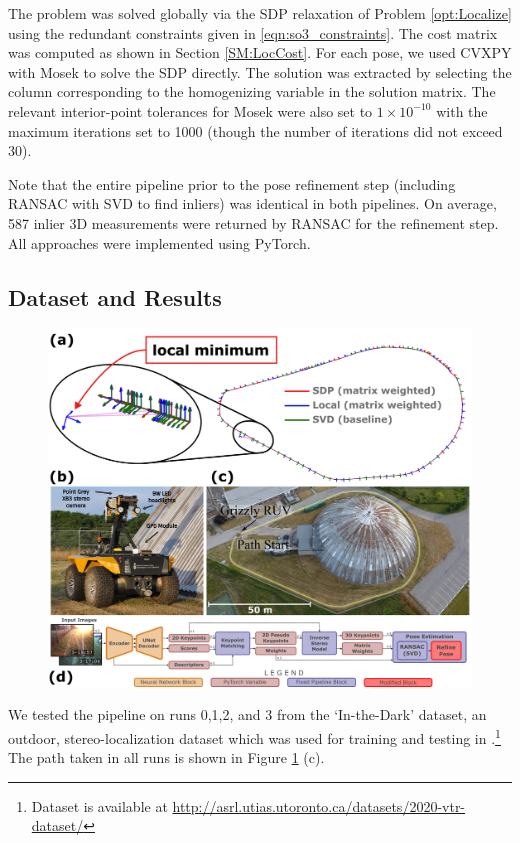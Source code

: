 \documentclass[lettersize,journal]{IEEEtran}
\begin{document}
The problem was solved globally via the SDP relaxation of Problem \eqref{opt:Localize} using the redundant constraints given in \eqref{eqn:so3_constraints}. The cost matrix was computed as shown in Section \ref{SM:LocCost}. For each pose, we used CVXPY \cite{diamondCVXPYPythonEmbeddedModeling} with Mosek \cite{mosek} to solve the SDP directly. The solution was extracted by selecting the column corresponding to the homogenizing variable in the solution matrix. The relevant interior-point tolerances for Mosek were also set to $1\times10^{-10}$ with the maximum iterations set to 1000 (though the number of iterations did not exceed 30).

Note that the entire pipeline prior to the pose refinement step (including RANSAC with SVD to find inliers) was identical in both pipelines. On average, 587 inlier 3D measurements were returned by RANSAC for the refinement step. All approaches were implemented using PyTorch.

\subsection{Dataset and Results}

\begin{figure}[]
	\centering
	\includegraphics[width=\columnwidth]{figs/in-the-dark-traj.png}
	\caption{}
	\label{fig:inthedark}
\end{figure}

We tested the pipeline on runs 0,1,2, and 3 from the `In-the-Dark' dataset, an outdoor, stereo-localization dataset which was used for training and testing in \cite{gridsethKeepingEyeThings2022}.\footnote{Dataset is available at \url{http://asrl.utias.utoronto.ca/datasets/2020-vtr-dataset/}} The path taken in all runs is shown in Figure \ref{fig:inthedark} (c). 
\end{document}

